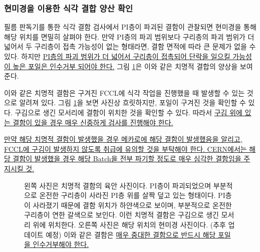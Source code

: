 \documentclass[11pt]{article}
\begin{document}
\subsubsection{현미경을 이용한 식각 결합 양산 확인}
필름 판독기를 통한 식각 결함 검사에서 PI층이 파괴된 결함이 관찰되면 현미경을 통해 해당 위치를 면밀히 살펴야 한다. 만약 PI층의 파괴 범위보다 구리층의 파괴 범위가 더 넓어서 두 구리층이 접촉 가능성이 없는 형태라면, 결함 면적에 따라 큰 문제가 없을 수 있다. 하지만 \uline{PI층의 파괴 범위가 더 넓어서 구리층이 접촉되어 단락을 일으킬 가능성이 높은 포일은 인수거부 되어야 한다.} 그림 \ref{fig:defect_bad_zoom}은 이와 같은 치명적 결합의 양상을 보여준다.

이와 같은 치명적 결함은 구겨진 FCCL에 식각 작업을 진행했을 때 발생할 수 있는 것으로 알려져 있다. 그림 \ref{fig:defect_bad_zoom}을 보면 사진상 흐릿하지만, 포일이 구겨진 것을 확인할 수 있다. 구김으로 생긴 모서리에 결함이 위치한 것을 확인할 수 있다. 따라서 \uline{구김 위에 있는 결함이 있을 경우 매우 신중하게 검사를 진행해야 한다.}

\uline{만약 해당 치명적 결함이 발생했을 경우 메카로에 해당 결함이 발생했음을 알리고, FCCL에 구김이 발생하지 않도록  취급에 유의할 것을 부탁해야 한다. CERN에서는 해당 결함이 발생했을 경우 해당 Batch을 전부 파기할 정도로 매우 심각한 결함임을 주지시킬 것.} 

\begin{figure}[htb]
  \centering
  \caption[치명적 식각 결함의 양상]{왼쪽 사진은 치명적 결함의 육안 사진이다. PI층이 파괴되었으며 부분적으로 온전한 구리층이 사라진 PI층 위를 살짝 덮고 있는 형태이다. PI층이 사라졌기 때문에 결함 위치가 하얀색으로 보이며, 부분적으로 온전한 구리층이 연한 갈색으로 보인다. 이런 치명적 결함은 구김으로 생긴 모서리 위에 위치한다. 오른쪽 사진은 해당 위치의 현미경 사진이다. (추후 업데이트 예정) 이와 같은 결함은 \uline{매우 중대한 결함으로 반드시 해당 포일을 인수거부해야 한다.}}
  \label{fig:defect_bad_zoom}
\end{figure}
\end{document}
